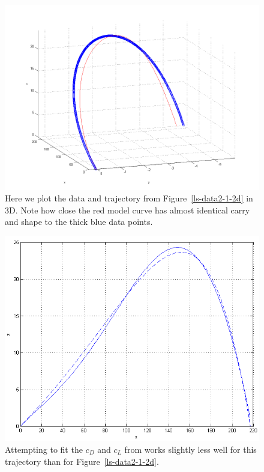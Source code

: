 \begin{figure}
\centering
\includegraphics[scale=0.55]{../images/ls-data2-1-3d.png}
\caption[Least squares using the Re and Sr form on data in 3D]{Here we plot the data and trajectory from
Figure~\ref{ls-data2-1-2d} in 3D. Note how close the red model curve has almost identical carry and shape to the thick blue data points.}
\label{ls-data2-1-3d}
\end{figure}

\begin{figure}
\centering
\includegraphics[scale=0.6]{../images/ls-data2-3-2d.png}
\caption[Trajectory which least squares struggles to fit]{Attempting to fit the $c_D$ and $c_L$ from
\citet{Lieberman2001} works slightly less well for this trajectory than for Figure~\ref{ls-data2-1-2d}.}
\label{ls-data2-3-2d}
\end{figure}

